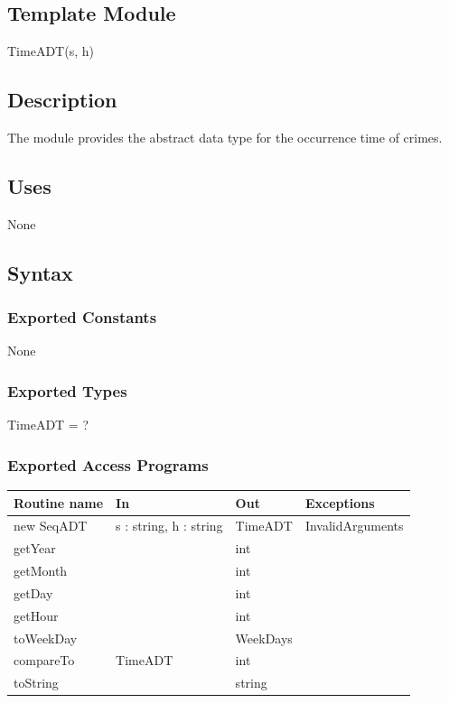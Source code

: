 \documentclass[12pt]{article}
\begin{document}
\subsection*{Template Module}

TimeADT(s, h)

\subsection*{Description}
The module provides the abstract data type for the occurrence time of crimes.

\subsection* {Uses}

None

\subsection* {Syntax}

\subsubsection* {Exported Constants}

None

\subsubsection* {Exported Types}

TimeADT = ?

\subsubsection* {Exported Access Programs}

\begin{tabular}{| l | l | l | p{5cm} |}
\hline
\textbf{Routine name} & \textbf{In} & \textbf{Out} & \textbf{Exceptions}\\
\hline
new SeqADT & s : string, h : string  & TimeADT & InvalidArguments\\
\hline
getYear & ~ & int & ~\\
\hline
getMonth & ~ & int & ~\\
\hline
getDay & ~ & int & ~\\
\hline
getHour& ~ & int & ~\\
\hline
toWeekDay & ~ & WeekDays & ~\\
\hline
compareTo & TimeADT & int & ~\\
\hline
toString & ~ & string & ~\\
\hline
\end{tabular}
\end{document}
